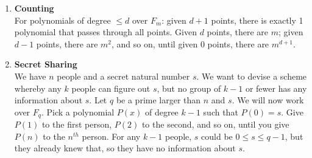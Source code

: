 \documentclass[10pt]{article}
\begin{document}
\begin{multicols}{2}
\begin{enumerate}
\begin{enumerate}
    \item \textbf{Counting} \\
    For polynomials of degree $\leq d$ over $F_m$: given $d+1$ points, there is exactly 1 polynomial that passes through all points. Given $d$ points, there are $m$; given $d-1$ points, there are $m^{2}$, and so on, until given 0 points, there are $m^{d+1}$.
    
    \item \textbf{Secret Sharing} \\
    We have $n$ people and a secret natural number $s$. We want to devise a scheme whereby any $k$ people can figure out $s$, but no group of $k-1$ or fewer has any information about $s$. Let $q$ be a prime larger than $n$ and $s$. We will now work over $F_q$. Pick a polynomial $P(x)$ of degree $k-1$ such that $P(0)=s$. Give $P(1)$ to the first person, $P(2)$ to the second, and so on, until you give $P(n)$ to the $n^{th}$ person. For any $k-1$ people, $s$ could be $0 \leq s \leq q-1$, but they already knew that, so they have no information about $s$. 
    \end{enumerate}
    

\end{enumerate}
\end{multicols}
\end{document}
